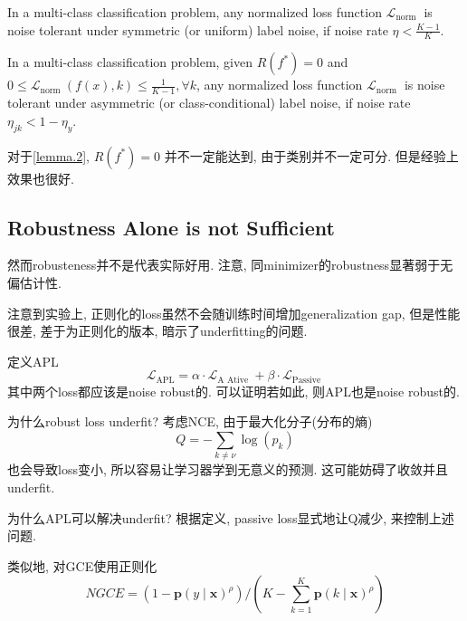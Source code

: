 \documentclass{article}
\begin{document}
\begin{lemma}
    In a multi-class classification problem, any normalized loss function $\mathcal{L}_{\text {norm }}$ is noise tolerant under symmetric (or uniform) label noise, if noise rate $\eta<\frac{K-1}{K}$.
\end{lemma}

\begin{lemma}
    In a multi-class classification problem, given $R\left(f^{*}\right)=0$ and $0 \leq \mathcal{L}_{\text {norm }}(f(x), k) \leq \frac{1}{K-1}, \forall k$, any
    normalized loss function $\mathcal{L}_{\text {norm }}$ is noise tolerant under asymmetric (or class-conditional) label noise, if noise rate $\eta_{j k}<1-\eta_{y} .$
    \label{lemma.2}
\end{lemma}

对于\ref{lemma.2}, $R\left(f^{*}\right)=0$ 并不一定能达到, 由于类别并不一定可分. 但是经验上效果也很好.

\subsection{Robustness Alone is not Sufficient}

\begin{remark}
    然而robusteness并不是代表实际好用. 注意, 同minimizer的robustness显著弱于无偏估计性.
\end{remark}

注意到实验上, 正则化的loss虽然不会随训练时间增加generalization gap, 但是性能很差, 差于为正则化的版本, 暗示了underfitting的问题.

定义APL
\begin{equation}
    \mathcal{L}_{\mathrm{APL}}=\alpha \cdot \mathcal{L}_{\mathrm{A} \text { Ative }}+\beta \cdot \mathcal{L}_{\text {Passive }}
\end{equation}
其中两个loss都应该是noise robust的. 可以证明若如此, 则APL也是noise robust的.

为什么robust loss underfit? 考虑NCE, 由于最大化分子(分布的熵)
\begin{equation}
    Q=-\sum_{k \neq \nu} \log \left(p_{k}\right)
\end{equation}
也会导致loss变小, 所以容易让学习器学到无意义的预测. 这可能妨碍了收敛并且underfit.

为什么APL可以解决underfit? 根据定义, passive loss显式地让Q减少, 来控制上述问题.

类似地, 对GCE使用正则化
\begin{equation}
    N G C E=\left(1-\boldsymbol{p}(y \mid \boldsymbol{x})^{\rho}\right) /\left(K-\sum_{k=1}^{K} \boldsymbol{p}(k \mid \boldsymbol{x})^{\rho}\right)
\end{equation}
    
\end{document}
